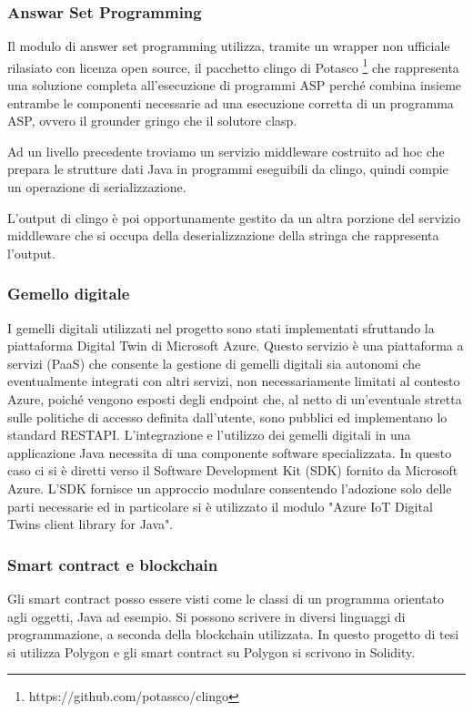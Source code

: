 \documentclass[a4paper,11pt]{article}
\begin{document}
\subsubsection{Answar Set Programming}

Il modulo di answer set programming utilizza, tramite un wrapper non ufficiale rilasiato con licenza open source, il pacchetto clingo di Potasco \footnote{https://github.com/potassco/clingo} che rappresenta una soluzione completa all'esecuzione di programmi ASP perché combina insieme entrambe le componenti necessarie ad una esecuzione corretta di un programma ASP, ovvero il grounder gringo che il solutore clasp.

Ad un livello precedente troviamo un servizio middleware costruito ad hoc che prepara le strutture dati Java in programmi eseguibili da clingo, quindi compie un operazione di serializzazione.

L'output di clingo è poi opportunamente gestito da un altra porzione del servizio middleware che si occupa della deserializzazione della stringa che rappresenta l'output.

\subsubsection{Gemello digitale}

I gemelli digitali utilizzati nel progetto sono stati implementati sfruttando la piattaforma Digital Twin di Microsoft Azure. Questo servizio è una piattaforma a servizi (PaaS) che consente la gestione di gemelli digitali sia autonomi che eventualmente integrati con altri servizi, non necessariamente limitati al contesto Azure, poiché vengono esposti degli endpoint che, al netto di un'eventuale stretta sulle politiche di accesso definita dall'utente, sono pubblici ed implementano lo standard RESTAPI.
L'integrazione e l'utilizzo dei gemelli digitali in una applicazione Java necessita di una componente software specializzata. In questo caso ci si è diretti verso il Software Development Kit (SDK) fornito da Microsoft Azure.
L'SDK fornisce un approccio modulare consentendo l'adozione solo delle parti necessarie ed in particolare si è utilizzato il modulo "Azure IoT Digital Twins client library for Java".

\subsubsection{Smart contract e blockchain}

Gli smart contract posso essere visti come le classi di un programma orientato agli oggetti, Java ad esempio. Si possono scrivere in diversi linguaggi di programmazione, a seconda della blockchain utilizzata. In questo progetto di tesi si utilizza Polygon e gli smart contract su Polygon si scrivono in Solidity.
\end{document}

